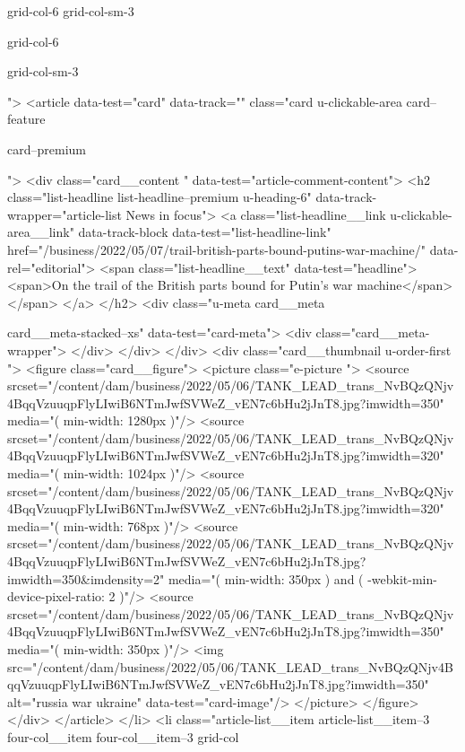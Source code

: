 {{{			
			grid-col-6 grid-col-sm-3
			
			grid-col-6
			
			
			
			
			
			grid-col-sm-3
			
			
			
			
			
			
			
			
			">
<article data-test="card" data-track="" class="card
			u-clickable-area
			card--feature
			
			card--premium
			
			
			
			
			
			 ">
<div class="card__content " data-test="article-comment-content">
<h2 class="list-headline list-headline--premium u-heading-6" data-track-wrapper="article-list News in focus">
<a class="list-headline__link u-clickable-area__link" data-track-block data-test="list-headline-link" href="/business/2022/05/07/trail-british-parts-bound-putins-war-machine/" data-rel="editorial">
<span class="list-headline__text" data-test="headline">
<span>On the trail of the British parts bound for Putin’s war machine</span>
</span>
</a>
</h2>
<div class="u-meta card__meta
						
						
						card__meta-stacked--xs" data-test="card-meta">
<div class="card__meta-wrapper">
</div>
</div>
</div>
<div class="card__thumbnail u-order-first ">
<figure class="card__figure">
<picture class="e-picture   ">
<source srcset="/content/dam/business/2022/05/06/TANK_LEAD_trans_NvBQzQNjv4BqqVzuuqpFlyLIwiB6NTmJwfSVWeZ_vEN7c6bHu2jJnT8.jpg?imwidth=350" media="( min-width: 1280px )"/>
<source srcset="/content/dam/business/2022/05/06/TANK_LEAD_trans_NvBQzQNjv4BqqVzuuqpFlyLIwiB6NTmJwfSVWeZ_vEN7c6bHu2jJnT8.jpg?imwidth=320" media="( min-width: 1024px )"/>
<source srcset="/content/dam/business/2022/05/06/TANK_LEAD_trans_NvBQzQNjv4BqqVzuuqpFlyLIwiB6NTmJwfSVWeZ_vEN7c6bHu2jJnT8.jpg?imwidth=320" media="( min-width: 768px )"/>
<source srcset="/content/dam/business/2022/05/06/TANK_LEAD_trans_NvBQzQNjv4BqqVzuuqpFlyLIwiB6NTmJwfSVWeZ_vEN7c6bHu2jJnT8.jpg?imwidth=350&imdensity=2" media="( min-width: 350px ) and ( -webkit-min-device-pixel-ratio: 2 )"/>
<source srcset="/content/dam/business/2022/05/06/TANK_LEAD_trans_NvBQzQNjv4BqqVzuuqpFlyLIwiB6NTmJwfSVWeZ_vEN7c6bHu2jJnT8.jpg?imwidth=350" media="( min-width: 350px )"/>
<img src="/content/dam/business/2022/05/06/TANK_LEAD_trans_NvBQzQNjv4BqqVzuuqpFlyLIwiB6NTmJwfSVWeZ_vEN7c6bHu2jJnT8.jpg?imwidth=350" alt="russia war ukraine" data-test="card-image"/>
</picture>
</figure>
</div>
</article>
</li>
<li class="article-list__item article-list__item--3 four-col__item four-col__item--3
			grid-col
			
}}}
